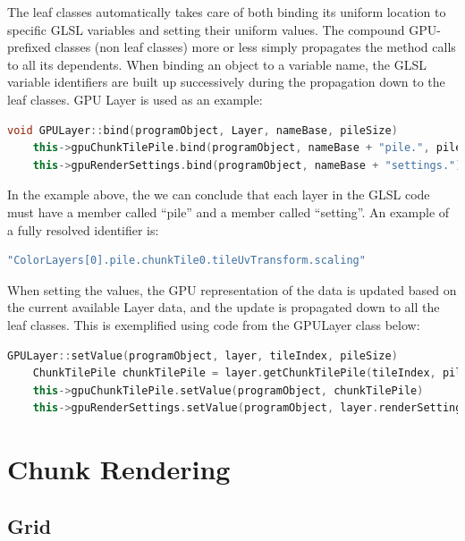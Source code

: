 The leaf classes automatically takes care of both binding its uniform location to specific GLSL variables and  setting their uniform values. The compound GPU-prefixed classes (non leaf classes) more or less simply propagates the method calls to all its dependents. When binding an object to a variable name, the GLSL variable identifiers are built up successively during the propagation down to the leaf classes. GPU Layer is used as an example:

\begin{lstlisting}[language=C++, basicstyle={\small\ttfamily}, breaklines=true, tabsize=2]
void GPULayer::bind(programObject, Layer, nameBase, pileSize)
	this->gpuChunkTilePile.bind(programObject, nameBase + "pile.", pileSize)
	this->gpuRenderSettings.bind(programObject, nameBase + "settings.")
\end{lstlisting}

In the example above, the we can conclude that each layer in the GLSL code must have a member called ``pile'' and a member called ``setting''. An example of a fully resolved identifier is: 

\begin{lstlisting}[language=C++, basicstyle={\small\ttfamily}, breaklines=true, tabsize=2]
"ColorLayers[0].pile.chunkTile0.tileUvTransform.scaling"
\end{lstlisting}

When setting the values, the GPU representation of the data is updated based on the current available Layer data, and the update is propagated down to all the leaf classes. This is exemplified using code from the GPULayer class below:

\begin{lstlisting}[language=C++, basicstyle={\small\ttfamily}, breaklines=true, tabsize=2]
GPULayer::setValue(programObject, layer, tileIndex, pileSize)
	ChunkTilePile chunkTilePile = layer.getChunkTilePile(tileIndex, pileSize)
	this->gpuChunkTilePile.setValue(programObject, chunkTilePile)
	this->gpuRenderSettings.setValue(programObject, layer.renderSettings()) 
\end{lstlisting}

\section{Chunk Rendering}

\subsection{Grid}

